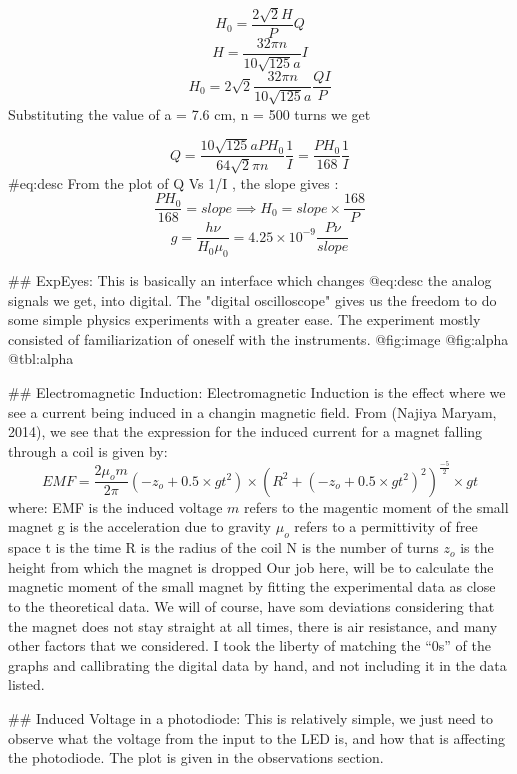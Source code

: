 \documentclass{double}
\begin{document}
$$ H_0 = \frac{2\sqrt{2}H}{P}Q $$
$$ H=\frac{32\pi n}{10\sqrt{125}a}I $$
$$ H_0=2\sqrt{2}\frac{32\pi n}{10\sqrt{125}a}\frac{QI}{P} $$
Substituting the value of a = 7.6 cm, n = 500 turns we get

$$ Q=\frac{10\sqrt{125}a PH_0}{64\sqrt{2}\pi n }\frac{1}{I}=\frac{PH_0}{168}\frac{1}{I} $$ {#eq:desc}
From the plot of Q Vs 1/I , the slope gives :
$$ \frac{PH_0}{168}=slope \implies H_0=slope \times \frac{168}{P} $$
$$ g=\frac{h \nu}{H_0 \mu_0} = 4.25\times10^{-9} \frac{P \nu}{slope} $$

## ExpEyes:
This is basically an interface which changes {@eq:desc} the analog signals we get, into digital. The "digital oscilloscope" gives us the freedom to do some simple physics experiments with a greater ease. The experiment mostly consisted of familiarization of oneself with the instruments. {@fig:image} {@fig:alpha} {@tbl:alpha}

## Electromagnetic Induction:
Electromagnetic Induction is the effect where we see a current being induced in a changin magnetic field. From (Najiya Maryam, 2014), we see that the expression for the induced current for a magnet falling through a coil is given by:
$$ EMF = \frac{2\mu_o m}{2\pi}(-z_o+0.5\times gt^2) \times (R^2+(-z_o+0.5\times gt^2)^2)^\frac{-5}{2}\times gt $$
where:
EMF is the induced voltage
$m$ refers to the magentic moment of the small magnet
g is the acceleration due to gravity
$\mu_o$ refers to a permittivity of free space
t is the time
R is the radius of the coil
N is the number of turns
$z_o$ is the height from which the magnet is dropped
Our job here, will be to calculate the magnetic moment of the small magnet by fitting the experimental data as close to the theoretical data. We will of course, have som deviations considering that the magnet does not stay straight at all times, there is air resistance, and many other factors that we considered. I took the liberty of matching the ``0s'' of the graphs and callibrating the digital data by hand, and not including it in the data listed.

## Induced Voltage in a photodiode:
This is relatively simple, we just need to observe what the voltage from the input to the LED is, and how that is affecting the photodiode. The plot is given in the observations section.
\end{document}
